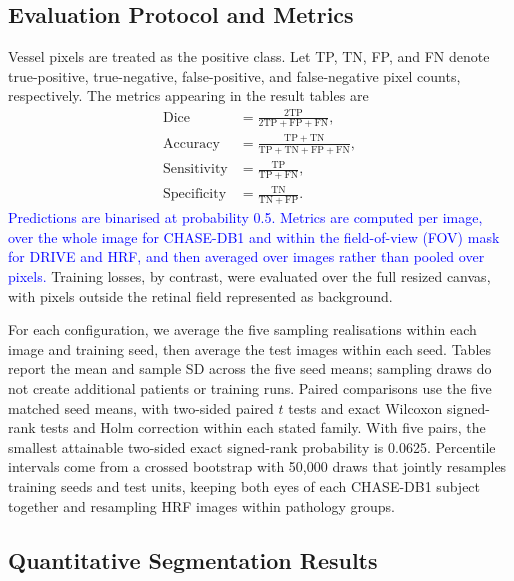 \documentclass[jimaging,article,submit,pdftex,moreauthors]
  {Definitions/mdpi}
\DeclareRobustCommand{\rev}[1]{\textcolor{blue}{#1}}
\newcommand{\revbegin}{\begingroup\color{blue}}
\DeclareRobustCommand{\rev}[1]{#1}
\newcommand{\revbegin}{\begingroup}
\newcommand{\revend}{\ifhmode\par\fi\endgroup}
\providecommand{\linelabel}[1]{}
\newcommand{\seclabel}[1]{\linelabel{rev:sec:#1}}
\newcommand{\secend}[1]{\linelabel{rev:end:#1}}
\begin{document}
\subsection{Evaluation Protocol and Metrics}
\label{sec:metrics}
\seclabel{metrics}

Vessel pixels are treated as the positive class. Let TP, TN, FP, and FN denote true-positive, true-negative, false-positive, and false-negative pixel counts, respectively. The metrics appearing in the result tables are
\begin{align}
\mathrm{Dice} &= \frac{2\mathrm{TP}}{2\mathrm{TP}+\mathrm{FP}+\mathrm{FN}}, \\
\mathrm{Accuracy} &= \frac{\mathrm{TP}+\mathrm{TN}}
{\mathrm{TP}+\mathrm{TN}+\mathrm{FP}+\mathrm{FN}}, \\
\mathrm{Sensitivity} &= \frac{\mathrm{TP}}{\mathrm{TP}+\mathrm{FN}}, \\
\mathrm{Specificity} &= \frac{\mathrm{TN}}{\mathrm{TN}+\mathrm{FP}}.
\end{align}
\rev{Predictions are binarised at probability 0.5. Metrics are computed per image, over the whole image for CHASE-DB1 and within the field-of-view (FOV) mask for DRIVE and HRF, and then averaged over images rather than pooled over pixels.} Training losses, by contrast, were evaluated over the full resized canvas, with pixels outside the retinal field represented as background.

\revbegin{}For each configuration, we average the five sampling realisations within each image and training seed, then average the test images within each seed. Tables report the mean and sample SD across the five seed means; sampling draws do not create additional patients or training runs. Paired comparisons use the five matched seed means, with two-sided paired $t$ tests and exact Wilcoxon signed-rank tests and Holm correction within each stated family. With five pairs, the smallest attainable two-sided exact signed-rank probability is 0.0625. Percentile intervals come from a crossed bootstrap with 50,000 draws that jointly resamples training seeds and test units, keeping both eyes of each CHASE-DB1 subject together and resampling HRF images within pathology groups.\secend{metrics}\revend{}

\subsection{Quantitative Segmentation Results}
\label{sec:quantitative}
\seclabel{quantitative}
\end{document}
